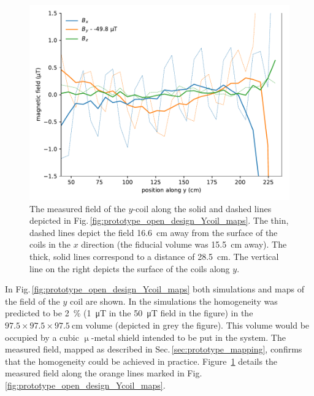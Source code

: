 \begin{figure}
  \centering
  \includegraphics[width=\linewidth]{gfx/prototype/open_planar_map_Y_By_section.pdf}
  \caption{The measured field of the $y$-coil along the solid and dashed lines depicted in Fig.\,\ref{fig:prototype_open_design_Ycoil_maps}. The thin, dashed lines depict the field \SI{16.6}{\centi\metre} away from the surface of the coils in the $x$ direction (the fiducial volume was \SI{15.5}{\centi\metre} away). The thick, solid lines correspond to a distance of \SI{28.5}{\centi\metre}. The vertical line on the right depicts the surface of the coils along $y$.}\label{fig:prototype_open_design_Ycoil_map_section}
\end{figure}

In Fig.\,\ref{fig:prototype_open_design_Ycoil_maps} both simulations and maps of the field of the $y$ coil are shown.
In the simulations the homogeneity was predicted to be \SI{2}{\percent} (\SI{1}{\micro\tesla} in the \SI{50}{\micro\tesla} field in the figure) in the $97.5 \times 97.5 \times \SI{97.5}{\centi\metre}$ volume (depicted in grey the figure). This volume would be occupied by a cubic $\upmu$-metal shield intended to be put in the system. The measured field, mapped as described in Sec.\,\ref{sec:prototype_mapping}, confirms that the homogeneity could be achieved in practice. Figure~\ref{fig:prototype_open_design_Ycoil_map_section} details the measured field along the orange lines marked in Fig.\,\ref{fig:prototype_open_design_Ycoil_maps}.

